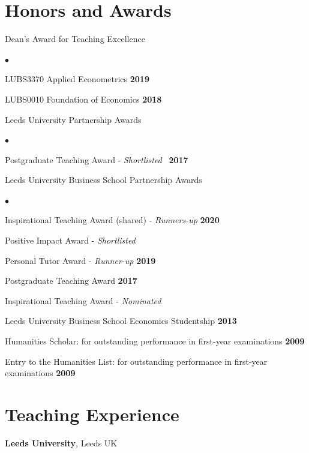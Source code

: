\documentclass[margin,line,9pt]{res}
\newenvironment{list2}{
  \begin{list}{$\bullet$}{%
      \setlength{\itemsep}{0in}
      \setlength{\parsep}{0in} \setlength{\parskip}{0in}
      \setlength{\topsep}{0in} \setlength{\partopsep}{0in}
      \setlength{\leftmargin}{0.2in}}}{\end{list}}
\begin{document}
\begin{resume}
\section{\sc Honors and Awards}
Dean's Award for Teaching Excellence\\
\vspace*{-.1in}
\begin{list2}
\item LUBS3370 Applied Econometrics \hfill{\bf 2019}
\\
\item LUBS0010 Foundation of Economics \hfill{\bf 2018}
\end{list2}

Leeds University Partnership Awards \\
\vspace*{-.1in}
\begin{list2}
\item Postgraduate Teaching Award - \textit{Shortlisted} \hfill\ {\bf 2017}
\end{list2}

Leeds University Business School Partnership Awards \hfill \\
\vspace*{-.1in}
\begin{list2}
\item Inspirational Teaching Award (shared) - \textit{Runners-up} \hfill {\bf 2020}
\item Positive Impact Award - \textit{Shortlisted} \hfill
\\
\item Personal Tutor Award - \textit{Runner-up} \hfill {\bf 2019}
\\
\item Postgraduate Teaching Award \hfill {\bf 2017}
\item Inspirational Teaching Award - \textit{Nominated}

\end{list2}

Leeds University Business School Economics Studentship \hfill {\bf 2013}

\vspace*{-2.5mm}
Humanities Scholar: for outstanding performance in first-year examinations \hfill {\bf 2009}

\vspace*{-2.5mm}
Entry to the Humanities List: for outstanding performance in first-year examinations \hfill {\bf 2009}

\section{\sc Teaching Experience}
{\bf Leeds University}, Leeds UK


\end{resume}
\end{document}

